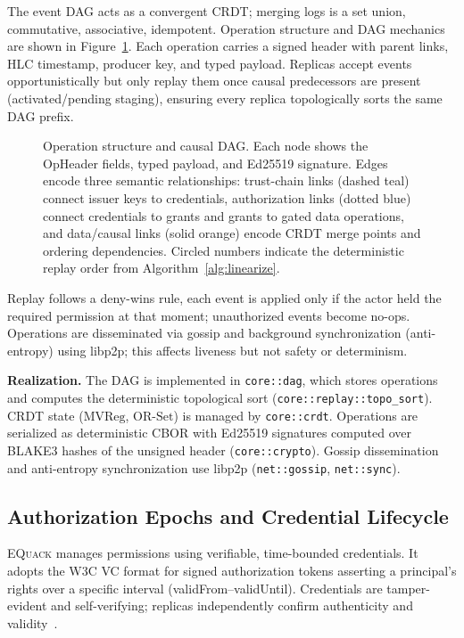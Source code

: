 \documentclass[10pt,journal,compsoc]{IEEEtran}
\newcommand{\equack}{\textsc{EQuack}}
\begin{document}
The event DAG acts as a convergent CRDT; merging logs is a set union, commutative, associative, idempotent. Operation structure and DAG mechanics are shown in Figure~\ref{fig:dag-structure}. Each operation carries a signed header with parent links, HLC timestamp, producer key, and typed payload. Replicas accept events opportunistically but only replay them once causal predecessors are present (activated/pending staging), ensuring every replica topologically sorts the same DAG prefix.

\begin{figure}[!htbp]
\centering
\resizebox{\textwidth}{!}{}
\caption{Operation structure and causal DAG\@. Each node shows the OpHeader fields, typed payload, and Ed25519 signature. Edges encode three semantic relationships: trust-chain links (dashed teal) connect issuer keys to credentials, authorization links (dotted blue) connect credentials to grants and grants to gated data operations, and data/causal links (solid orange) encode CRDT merge points and ordering dependencies. Circled numbers indicate the deterministic replay order from Algorithm~\ref{alg:linearize}.}
\label{fig:dag-structure}
\end{figure}

Replay follows a deny-wins rule, each event is applied only if the actor held the required permission at that moment; unauthorized events become no-ops. Operations are disseminated via gossip and background synchronization (anti-entropy) using libp2p; this affects liveness but not safety or determinism.

\textbf{Realization.} The DAG is implemented in \texttt{core::dag}, which stores operations and computes the deterministic topological sort (\texttt{core::replay::topo\_sort}). CRDT state ($\mathrm{MVReg}$, $\mathrm{OR\text{-}Set}$) is managed by \texttt{core::crdt}. Operations are serialized as deterministic CBOR with Ed25519 signatures computed over BLAKE3 hashes of the unsigned header (\texttt{core::crypto}). Gossip dissemination and anti-entropy synchronization use libp2p (\texttt{net::gossip}, \texttt{net::sync}).

\subsection{Authorization Epochs and Credential Lifecycle}

\equack{} manages permissions using verifiable, time-bounded credentials. It adopts the W3C VC format for signed authorization tokens asserting a principal's rights over a specific interval (validFrom--validUntil). Credentials are tamper-evident and self-verifying; replicas independently confirm authenticity and validity~\cite{w3c_vc_2024}.
\end{document}
